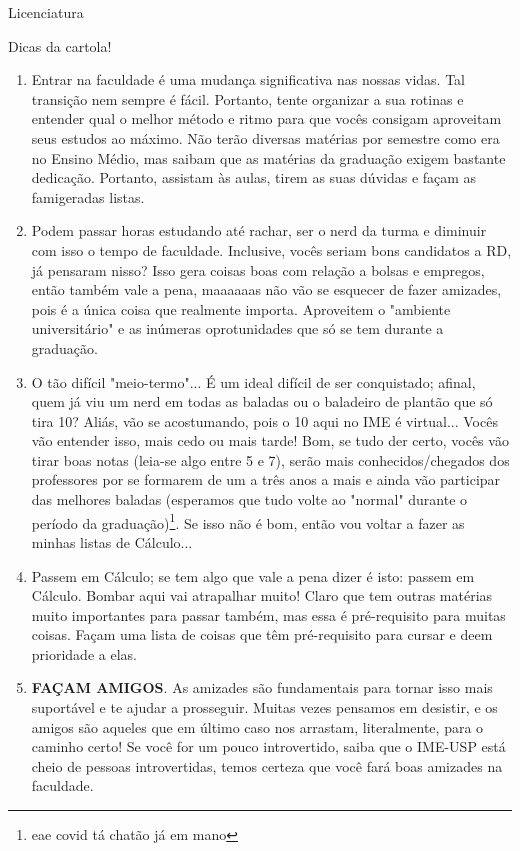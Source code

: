\begin{subsecao}{Licenciatura}
\begin{subsubsecao}{Dicas da cartola!}
\begin{enumerate}
\item Entrar na faculdade é uma mudança significativa nas nossas vidas. Tal transição
nem sempre é fácil. Portanto, tente organizar a sua rotinas e entender qual o melhor
método e ritmo para que vocês consigam aproveitam seus estudos ao máximo. Não terão diversas
matérias por semestre como era no Ensino Médio, mas saibam que as matérias da graduação exigem
 bastante dedicação. Portanto, assistam às aulas, tirem as suas dúvidas e façam as famigeradas listas. 
\item Podem passar horas estudando até rachar, ser o nerd da turma e diminuir com
 isso o tempo de faculdade. Inclusive, vocês seriam bons candidatos a RD, já pensaram nisso? 
Isso gera coisas boas com relação a bolsas e empregos, então também vale a pena, 
maaaaaas não vão se esquecer de fazer amizades, pois é a única coisa que realmente importa.
Aproveitem o "ambiente universitário" e as inúmeras oprotunidades que só se tem durante
a graduação.
\item O tão difícil "meio-termo"... É um ideal difícil de ser conquistado; afinal,
  quem já viu um nerd em todas as baladas ou o baladeiro de plantão que só tira
  10? Aliás, vão se acostumando, pois o 10 aqui no IME é virtual... Vocês vão
  entender isso, mais cedo ou mais tarde! Bom, se tudo der certo, vocês vão
  tirar boas notas (leia-se algo entre 5 e 7), serão mais conhecidos/chegados
  dos professores por se formarem de um a três anos a mais e ainda
  vão participar das melhores baladas (esperamos que tudo volte ao "normal" durante
  o período da graduação)\footnote{eae covid tá chatão já em mano}.  %
  Se isso não é bom, então vou voltar a fazer as minhas listas de Cálculo...
\item Passem em Cálculo; se tem algo que vale a pena dizer é isto: passem em
  Cálculo. Bombar aqui vai atrapalhar muito! Claro que tem outras matérias muito
  importantes para passar também, mas essa é pré-requisito para muitas coisas.
  Façam uma lista de coisas que têm pré-requisito para cursar e deem prioridade
  a elas. 
  \item \textbf{FAÇAM AMIGOS}. As amizades são fundamentais para tornar isso
mais suportável e te ajudar a prosseguir. Muitas vezes pensamos em desistir,
 e os amigos são aqueles que em último caso nos arrastam, literalmente, para o caminho certo!
 Se você for um pouco introvertido, saiba que o IME-USP está cheio de pessoas introvertidas, 
 temos certeza que você fará boas amizades na faculdade.

\end{enumerate}
\end{subsubsecao}
\end{subsecao}
